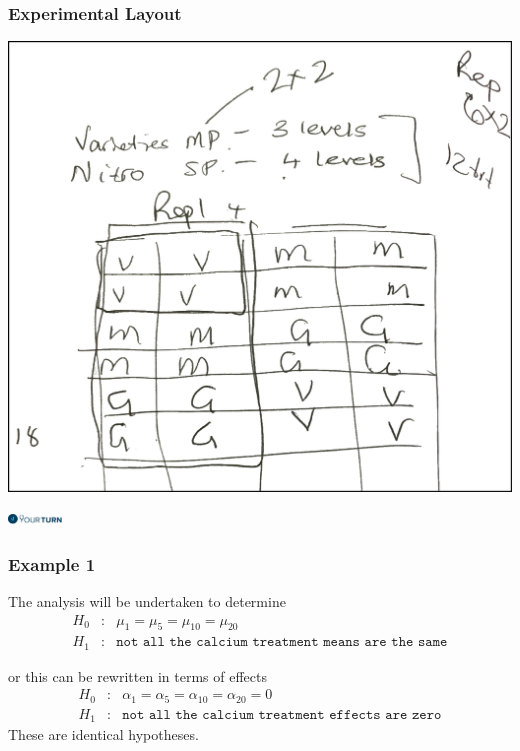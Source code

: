 \begin{frame}\frametitle{Experimental Layout}

\begin{center}
\includegraphics[height = 0.7\textheight]{exptlayout.png}
\end{center}
\flushright
\includegraphics[height = 0.3cm]{yourturn}
\end{frame}



\begin{frame}\frametitle{Example 1}
The analysis will be undertaken to determine
\begin{eqnarray*}
	H_0&:& \mu_1 = \mu_5 = \mu_{10} = \mu_{20} \\
	H_1&:& \texttt{not all the calcium treatment means are the same}
\end{eqnarray*}

or this can be rewritten in terms of effects
\begin{eqnarray*}
	H_0&:& \alpha_1 = \alpha_5 = \alpha_{10} = \alpha_{20} = 0 \\
	H_1&:& \texttt{not all the calcium treatment effects are zero}
\end{eqnarray*}
These are identical hypotheses.
\end{frame}


